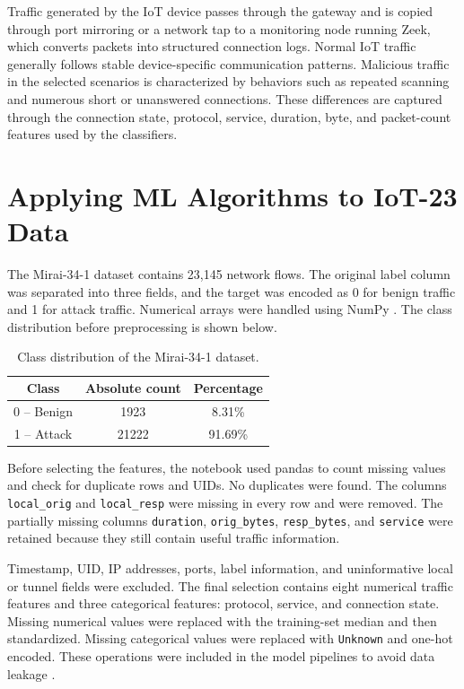 \documentclass{article}
\begin{document}
Traffic generated by the IoT device passes through the gateway and is copied through port mirroring or a network tap to a monitoring node running Zeek, which converts packets into structured connection logs. Normal IoT traffic generally follows stable device-specific communication patterns. Malicious traffic in the selected scenarios is characterized by behaviors such as repeated scanning and numerous short or unanswered connections. These differences are captured through the connection state, protocol, service, duration, byte, and packet-count features used by the classifiers.

\section{Applying ML Algorithms to IoT-23 Data}
The Mirai-34-1 dataset contains 23,145 network flows. The original label column was separated into three fields, and the target was encoded as 0 for benign traffic and 1 for attack traffic. Numerical arrays were handled using NumPy \cite{harris2020array}. The class distribution before preprocessing is shown below.

\begin{table}[h]
  \centering
  \begin{tabular}{|c|c|c|}
      \hline
      Class & Absolute count & Percentage \\
      \hline
      0 -- Benign & 1923 & 8.31\% \\
      1 -- Attack & 21222 & 91.69\% \\
      \hline
  \end{tabular}
  \caption{Class distribution of the Mirai-34-1 dataset.}
  \label{tab:class_distribution}
\end{table}

Before selecting the features, the notebook used pandas \cite{pandas-2.3.3} to count missing values and check for duplicate rows and UIDs. No duplicates were found. The columns \texttt{local\_orig} and \texttt{local\_resp} were missing in every row and were removed. The partially missing columns \texttt{duration}, \texttt{orig\_bytes}, \texttt{resp\_bytes}, and \texttt{service} were retained because they still contain useful traffic information.

Timestamp, UID, IP addresses, ports, label information, and uninformative local or tunnel fields were excluded. The final selection contains eight numerical traffic features and three categorical features: protocol, service, and connection state. Missing numerical values were replaced with the training-set median and then standardized. Missing categorical values were replaced with \texttt{Unknown} and one-hot encoded. These operations were included in the model pipelines to avoid data leakage \cite{scikit-learn}.
\end{document}
